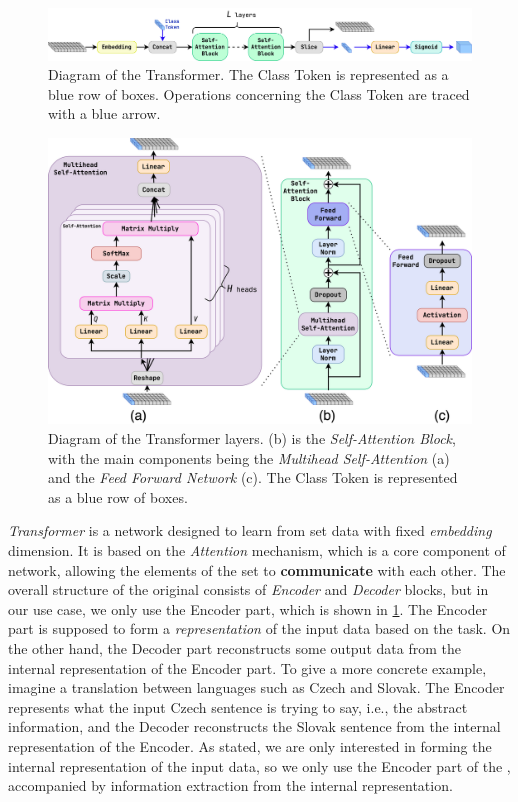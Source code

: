 \begin{figure}[htb]
    \centering
    \includegraphics[width=1.\linewidth]{src/diagrams/transformer.png}
    \caption{Diagram of the Transformer. The Class Token is represented as a blue row of boxes. Operations concerning the Class Token are traced with a blue arrow.}
    \label{fig:trans}
\end{figure}

\begin{figure}[htb]
    \centering
    \includegraphics[width=0.9\linewidth]{src/diagrams/transformer_layers.png}
    \caption{Diagram of the Transformer layers. (b) is the \emph{Self-Attention Block}, with the main components being the \emph{Multihead Self-Attention} (a) and the \emph{Feed Forward Network} (c). The Class Token is represented as a blue row of boxes.}
    \label{fig:trans_layers}
\end{figure}

\emph{Transformer} \cite{att_is_all} is a network designed to learn from set data with fixed \emph{embedding} dimension.
It is based on the \emph{Attention} mechanism, which is a core component of \trans network, allowing the elements of the set to \textbf{communicate} with each other.
The overall structure of the original \trans consists of \emph{Encoder} and \emph{Decoder} blocks, but in our use case, we only use the Encoder part, which is shown in \cref{fig:trans}.
The Encoder part is supposed to form a \emph{representation} of the input data based on the task.
On the other hand, the Decoder part reconstructs some output data from the internal representation of the Encoder part.
To give a more concrete example, imagine a translation between languages such as Czech and Slovak.
The Encoder represents what the input Czech sentence is trying to say, i.e., the abstract information, and the Decoder reconstructs the Slovak sentence from the internal representation of the Encoder.
As stated, we are only interested in forming the internal representation of the input data, so we only use the Encoder part of the \trans, accompanied by information extraction from the internal representation.

